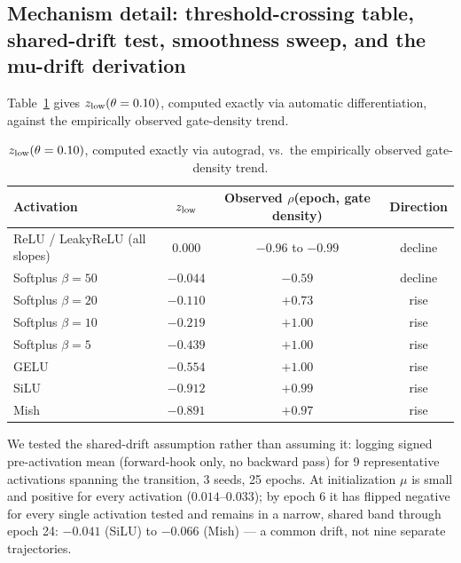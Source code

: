 \subsection{Mechanism detail: threshold-crossing table, shared-drift test, smoothness sweep, and the mu-drift derivation}
\label{app:mechanism-detail}

Table~\ref{tab:zlow} gives $z_{\rm low}(\theta=0.10)$, computed exactly via
automatic differentiation, against the empirically observed gate-density
trend.

\begin{table}[h]
\centering
\caption{$z_{\rm low}(\theta=0.10)$, computed exactly via autograd, vs.\
the empirically observed gate-density trend.}
\label{tab:zlow}
\begin{tabular}{lccc}
\toprule
Activation & $z_{\rm low}$ & Observed $\rho$(epoch, gate density) & Direction\\
\midrule
ReLU / LeakyReLU (all slopes) & $0.000$ & $-0.96$ to $-0.99$ & decline\\
Softplus $\beta=50$ & $-0.044$ & $-0.59$ & decline\\
Softplus $\beta=20$ & $-0.110$ & $+0.73$ & rise\\
Softplus $\beta=10$ & $-0.219$ & $+1.00$ & rise\\
Softplus $\beta=5$ & $-0.439$ & $+1.00$ & rise\\
GELU & $-0.554$ & $+1.00$ & rise\\
SiLU & $-0.912$ & $+0.99$ & rise\\
Mish & $-0.891$ & $+0.97$ & rise\\
\bottomrule
\end{tabular}
\end{table}

We tested the shared-drift assumption rather than assuming it: logging
signed pre-activation mean (forward-hook only, no backward pass) for 9
representative activations spanning the transition, 3 seeds, 25 epochs. At
initialization $\mu$ is small and positive for every activation
($0.014$--$0.033$); by epoch 6 it has flipped negative for every single
activation tested and remains in a narrow, shared band through epoch 24:
$-0.041$ (SiLU) to $-0.066$ (Mish) --- a common drift, not nine separate
trajectories.

